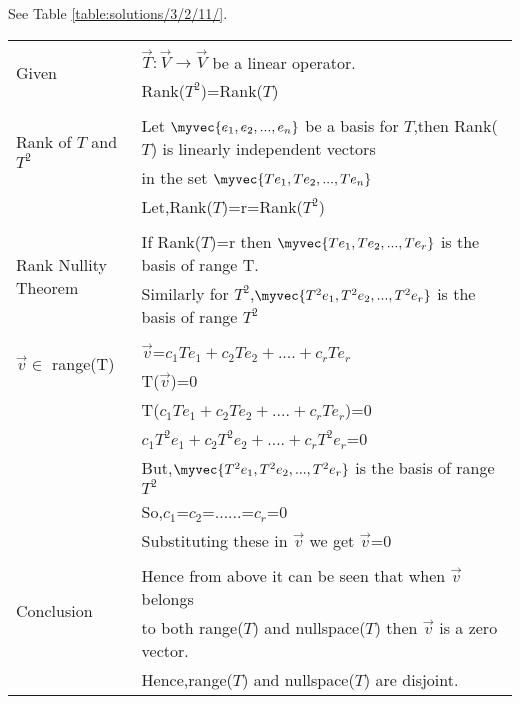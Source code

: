 See Table \ref{table:solutions/3/2/11/}.
\begin{table*}[!ht]
	\begin{tabular}{|l|l|}
		\hline
		\multirow{3}{*}{Given} & \\
		& $\vec{T}:\vec{V} \to \vec{V}$ be a linear operator.\\
		& Rank($T^2$)=Rank($T$)\\
		\hline	
		\multirow{3}{*}{Rank of $T$ and $T^2$ } & \\
		& Let ${\myvec{e_{1}, e_{2},...,e_{n}}}$ be a basis for $T$,then Rank($T$) is linearly independent vectors\\& in the set  ${\myvec{Te_{1}, Te_{2},...,Te_{n}}}$ \\
	    & Let,Rank($T$)=r=Rank($T^2$)\\
	    
		\hline	
		\multirow{3}{*}{Rank Nullity Theorem} & \\
		& If Rank($T$)=r then ${\myvec{Te_{1}, Te_{2},...,Te_{r}}}$ is the basis of range T.\\
		& Similarly for $T^2$,${\myvec{T^2e_{1}, T^2e_{2},...,T^2e_{r}}}$ is the basis of range $T^2$\\
		\hline
		\multirow{3}{*}{$\vec{v}$$\in$ range(T)} & 
	    \\
	    & $\vec{v}$=$c_1Te_{1}+c_2Te_{2}+....+c_rTe_{r}$\\
	    $\vec{v}$$\in$ nullspace(T) & T($\vec{v}$)=0\\
	    & T($c_1Te_{1}+c_2Te_{2}+....+c_rTe_{r}$)=0\\
	    & $c_1T^2e_{1}+c_2T^2e_{2}+....+c_rT^2e_{r}$=0\\
	    & But,${\myvec{T^2e_{1}, T^2e_{2},...,T^2e_{r}}}$ is the basis of range $T^2$\\
	    & So,$c_1$=$c_2$=......=$c_r$=0\\
	    & Substituting these in $\vec{v}$ we get $\vec{v}$=0\\
	    \hline
		\multirow{3}{*}{Conclusion} & \\
		& Hence from above it can be seen that when $\vec{v}$ belongs\\ 
		&  to both range($T$) and nullspace($T$) then $\vec{v}$ is a zero vector.\\
		& Hence,range($T$) and nullspace($T$) are disjoint.
		\\
		\hline
	\end{tabular}
\caption{}
\label{table:solutions/3/2/11/}
\end{table*}
